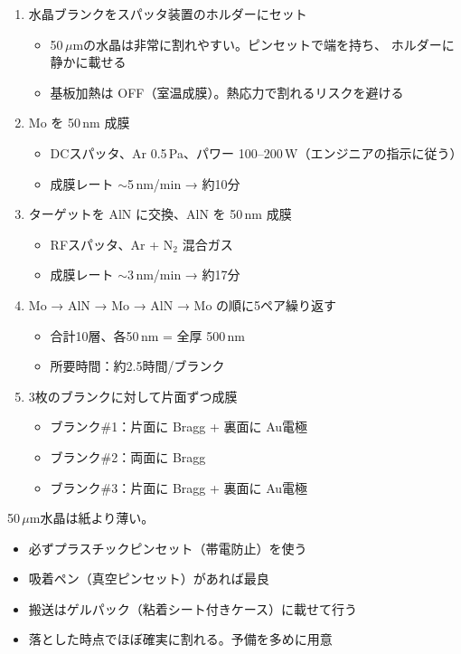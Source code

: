 \documentclass[11pt,a4paper]{article}
\def\textbf#1{#1}%
\begin{document}
\begin{enumerate}[leftmargin=*]
\item 水晶ブランクをスパッタ装置のホルダーにセット
  \begin{itemize}
  \item 50\,$\mu$mの水晶は非常に割れやすい。ピンセットで端を持ち、
    ホルダーに\textbf{静かに}載せる
  \item 基板加熱は OFF（室温成膜）。熱応力で割れるリスクを避ける
  \end{itemize}
\item Mo を 50\,nm 成膜
  \begin{itemize}
  \item DCスパッタ、Ar 0.5\,Pa、パワー 100--200\,W（エンジニアの指示に従う）
  \item 成膜レート $\sim$5\,nm/min → 約10分
  \end{itemize}
\item ターゲットを AlN に交換、AlN を 50\,nm 成膜
  \begin{itemize}
  \item RFスパッタ、Ar + N$_2$ 混合ガス
  \item 成膜レート $\sim$3\,nm/min → 約17分
  \end{itemize}
\item Mo → AlN → Mo → AlN → Mo の順に5ペア繰り返す
  \begin{itemize}
  \item 合計10層、各50\,nm = 全厚 500\,nm
  \item 所要時間：約2.5時間/ブランク
  \end{itemize}
\item \textbf{3枚}のブランクに対して片面ずつ成膜
  \begin{itemize}
  \item ブランク\#1：片面に Bragg + 裏面に Au電極
  \item ブランク\#2：両面に Bragg
  \item ブランク\#3：片面に Bragg + 裏面に Au電極
  \end{itemize}
\end{enumerate}

\begin{tcolorbox}[colback=red!5,colframe=red!60!black,title=注意：水晶の取り扱い]
50\,$\mu$m水晶は\textbf{紙より薄い}。
\begin{itemize}
\item 必ずプラスチックピンセット（帯電防止）を使う
\item 吸着ペン（真空ピンセット）があれば最良
\item 搬送はゲルパック（粘着シート付きケース）に載せて行う
\item 落とした時点でほぼ確実に割れる。予備を多めに用意
\end{itemize}
\end{tcolorbox}
\end{document}
